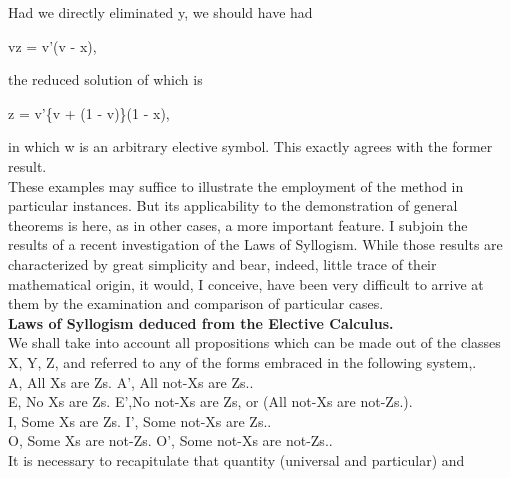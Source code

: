\documentclass{article}
\begin{document}
{{{{Had we directly eliminated y, we should have had
\begin{center} vz = v'(v - x), \end{center}
the reduced solution of which is
\begin{center} z = v'\{v + (1 - v)\}(1 - x),\end{center}
in which w is an arbitrary elective symbol. This exactly agrees with the former
result.\vspace{.1in}\\
\hspace*{.2in} These examples may suffice to illustrate the employment of the method in
particular instances. But its applicability to the demonstration of general theorems
is here, as in other cases, a more important feature. I subjoin the results
of a recent investigation of the Laws of Syllogism. While those results are characterized
by great simplicity and bear, indeed, little trace of their mathematical
origin, it would, I conceive, have been very difficult to arrive at them by the
examination and comparison of particular cases.\vspace{.3in}\\
\large{\bf Laws of Syllogism deduced from the Elective Calculus.}\vspace{.1in}\\
\normalsize
We shall take into account all propositions which can be made out of the classes
X, Y, Z, and referred to any of the forms embraced in the following system,.\vspace{.1in}\\
\hspace*{.2in} A, All Xs are Zs.\hspace*{.3in}  A', All not-Xs are Zs..\vspace{.1in}\\
\hspace*{.2in} E, No Xs are Zs.\hspace{.3in} E',No not-Xs are Zs, or (All not-Xs are not-Zs.).\vspace{.1in}\\
\hspace*{.2in} I, Some Xs are Zs.\hspace{.3in} I', Some not-Xs are Zs..\vspace{.1in}\\
\hspace*{.2in} O, Some Xs are not-Zs. O', Some not-Xs are not-Zs..\vspace{.1in}\\
\hspace*{.1in} It is necessary to recapitulate that quantity (universal and particular) and
}}}}
\end{document}
